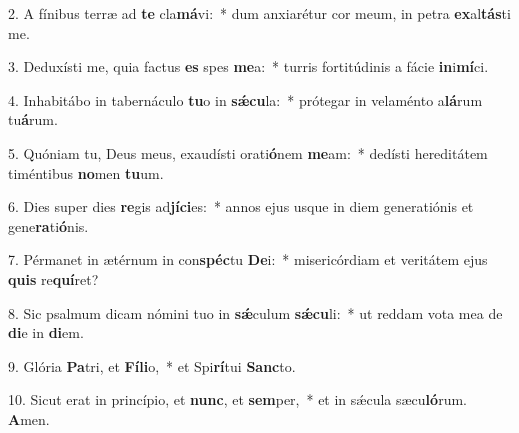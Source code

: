 2. A fínibus terræ ad \textbf{te} cla\textbf{má}vi:~*  dum anxiarétur cor meum, in petra \textbf{ex}al\textbf{tás}ti me.\

3. Deduxísti me, quia factus \textbf{es} spes \textbf{me}a:~*  turris fortitúdinis a fácie \textbf{in}i\textbf{mí}ci.\

4. Inhabitábo in tabernáculo \textbf{tu}o in \textbf{sǽ}\textbf{cu}la:~*  prótegar in velaménto a\textbf{lá}rum tu\textbf{á}rum.\

5. Quóniam tu, Deus meus, exaudísti orati\textbf{ó}nem \textbf{me}am:~*  dedísti hereditátem timéntibus \textbf{no}men \textbf{tu}um.\

6. Dies super dies \textbf{re}gis ad\textbf{jí}\textbf{ci}es:~*  annos ejus usque in diem generatiónis et gene\textbf{ra}ti\textbf{ó}nis.\

7. Pérmanet in ætérnum in con\textbf{spéc}tu \textbf{De}i:~*  misericórdiam et veritátem ejus \textbf{quis} re\textbf{quí}ret?\

8. Sic psalmum dicam nómini tuo in \textbf{sǽ}culum \textbf{sǽ}\textbf{cu}li:~*  ut reddam vota mea de \textbf{di}e in \textbf{di}em.\

9. Glória \textbf{Pa}tri, et \textbf{Fí}\textbf{li}o,~*  et Spi\textbf{rí}tui \textbf{Sanc}to.\

10. Sicut erat in princípio, et \textbf{nunc}, et \textbf{sem}per,~*  et in sǽcula sæcu\textbf{ló}rum. \textbf{A}men.\

